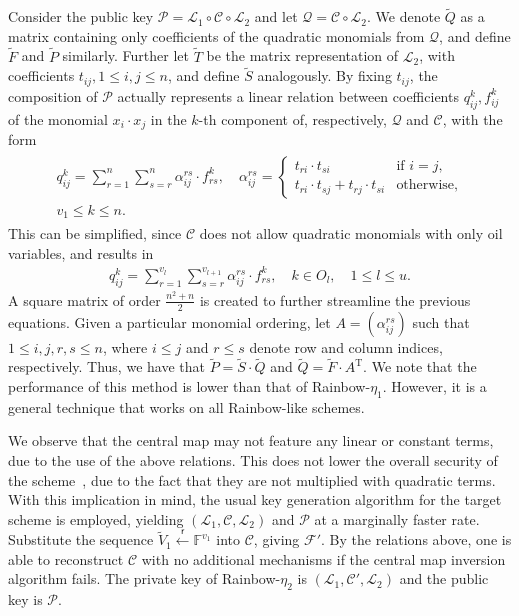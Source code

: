 \documentclass[draft, 12pt, a4paper, oneside]{memoir}
\newcommand{\random}{\overset{\mathsf{r}}{\gets}}
\theoremstyle{definition}
\begin{document}
Consider the public key
$\mathcal{P} = \mathcal{L}_{1} \circ \mathcal{C} \circ \mathcal{L}_{2}$ and let
$\mathcal{Q} = \mathcal{C} \circ \mathcal{L}_{2}$. We denote $\widetilde{Q}$ as a
matrix containing only coefficients of the quadratic monomials from
$\mathcal{Q}$, and define $\widetilde{F}$ and $\widetilde{P}$ similarly.
Further let $\widetilde{T}$ be the matrix representation of $\mathcal{L}_{2}$, with
coefficients $t_{ij}, 1 \leq i, j \leq n$, and define $\widetilde{S}$
analogously. By fixing $t_{ij}$, the composition of $\mathcal{P}$ actually
represents a linear relation between coefficients $q_{ij}^{k}, f_{ij}^{k}$ of
the monomial $x_{i} \cdot x_{j}$ in the $k$-th component of, respectively,
$\mathcal{Q}$ and $\mathcal{C}$, with the form
\begin{align}
  \begin{split}
    q_{ij}^{k} = \sum_{r = 1}^{n} \sum_{s = r}^{n}
      \alpha_{ij}^{rs} \cdot f_{rs}^{k}, \quad
      \alpha_{ij}^{rs} = \begin{cases}
        t_{ri} \cdot t_{si}                         & \text{if } i = j, \\
        t_{ri} \cdot t_{sj} + t_{rj} \cdot t_{si}   & \text{otherwise},
      \end{cases} \\
      v_{1} \leq k \leq n.
  \end{split}
\end{align}
This can be simplified, since $\mathcal{C}$ does not allow quadratic monomials
with only oil variables, and results in
\begin{align}
  q_{ij}^{k} = \sum_{r = 1}^{v_{l}} \sum_{s = r}^{v_{l + 1}}
    \alpha_{ij}^{rs} \cdot f_{rs}^{k},
      \quad k \in O_{l}, \quad 1 \leq l \leq u.
\end{align}
A square matrix of order $\frac{n^{2} + n}{2}$ is created to further streamline
the previous equations. Given a particular monomial ordering, let
$A = (\alpha_{ij}^{rs})$ such that $1 \leq i, j, r, s \leq n$, where
$i \leq j$ and $r \leq s$ denote row and column indices, respectively. Thus, we
have that $\widetilde{P} = \widetilde{S} \cdot \widetilde{Q}$ and
$\widetilde{Q} = \widetilde{F} \cdot A^{\text{T}}$. We note that the
performance of this method is lower than that of Rainbow-$\eta_{1}$. However,
it is a general technique that works on all Rainbow-like schemes.

We observe that the central map may not feature any linear or constant terms, due
to the use of the above relations. This does not lower the overall security of
the scheme~\cite[Section 3.1]{Ding:201901}, due to the fact that they are not multiplied with quadratic terms.
With this implication in mind, the usual key generation algorithm for the
target scheme is employed, yielding $(\mathcal{L}_{1}, \mathcal{C}, \mathcal{L}_{2})$
and $\mathcal{P}$ at a marginally faster rate. Substitute the sequence
$\widetilde{V}_{1} \random \mathbb{F}^{v_{1}}$ into $\mathcal{C}$, giving
$\mathcal{F'}$. By the relations above, one is able to reconstruct
$\mathcal{C}$ with no additional mechanisms if the central map inversion
algorithm fails. The private key of Rainbow-$\eta_{2}$ is
$(\mathcal{L}_{1}, \mathcal{C}', \mathcal{L}_{2})$ and the public key is $\mathcal{P}$.
\end{document}
